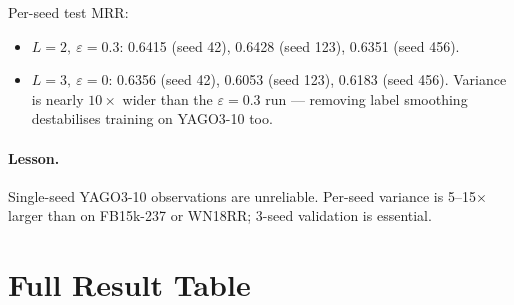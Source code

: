Per-seed test MRR:
\begin{itemize}
  \item $L=2,\ \varepsilon=0.3$: 0.6415 (seed 42), 0.6428 (seed 123), 0.6351 (seed 456).
  \item $L=3,\ \varepsilon=0$:   0.6356 (seed 42), 0.6053 (seed 123), 0.6183 (seed 456). Variance is nearly $10\times$ wider than the $\varepsilon=0.3$ run --- removing label smoothing destabilises training on YAGO3-10 too.
\end{itemize}

\paragraph{Lesson.}
Single-seed YAGO3-10 observations are unreliable. Per-seed variance is 5--15$\times$ larger than on FB15k-237 or WN18RR; 3-seed validation is essential.

\section{Full Result Table}
\label{app:full-results}

